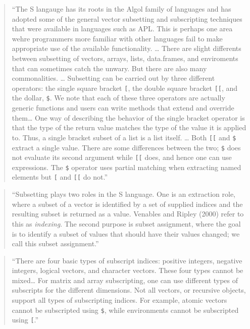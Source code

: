 \documentclass[]{tufte-book}
\begin{document}
\begin{quote}
``The S langauge has its roots in the Algol family of languages and has adopted some
of the general vector subsetting and subscripting techniques that were available in
languages such as APL. This is perhaps one area wehre programmers more familiar with
other languages fail to make appropriate use of the available functionality. \ldots{}
There are slight differents between subsetting of vectors, arrays, lists, data.frames,
and enviroments that can sometimes catch the unwary. But there are also many
commonalities. \ldots{} Subsetting can be carried out by three different operators:
the single square bracket \texttt{{[}}, the double square bracket \texttt{{[}{[}}, and the dollar, \texttt{\$}.
We note that each of these three operators are actually generic functions and users
can write methods that extend and override them\ldots{} One way of describing the behavior
of the single bracket operator is that the type of the return value matches the type
of the value it is applied to. Thus, a single bracket subset of a list is a list
itself. \ldots{} Both \texttt{{[}{[}} and \texttt{\$} extract a single value. There are some differences
between the two; \texttt{\$} does not evaluate its second argument while \texttt{{[}{[}} does, and hence
one can use expressions. The \texttt{\$} operator uses partial matching when extracting
named elements but \texttt{{[}} and \texttt{{[}{[}} do not.'' \citep{gentleman2008r}
\end{quote}

\begin{quote}
``Subsetting plays two roles in the S language. One is an extraction role, where a subset
of a vector is identified by a set of supplied indices and the resulting subset is
returned as a value. Venables and Ripley (2000) refer to this as \emph{indexing}. The
second purpose is subset assignment, where the goal is to identify a subset of
values that should have their values changed; we call this subset assignment.''
\citep{gentleman2008r}
\end{quote}

\begin{quote}
``There are four basic types of subscript indices: positive integers, negative
integers, logical vectors, and character vectors. These four types cannot be mixed\ldots{}
For matrix and array subscripting, one can use different types of subscripts for
the different dimensions. Not all vectors, or recursive objects, support all types
of subscripting indices. For example, atomic vectors cannot be subscripted using
\texttt{\$}, while environments cannot be subscripted using \texttt{{[}}.'' \citep{gentleman2008r}
\end{quote}
\end{document}
